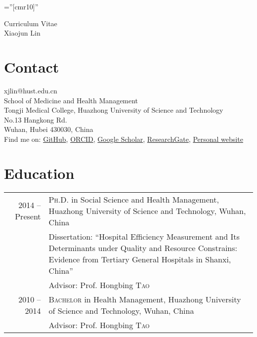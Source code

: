 \documentclass[a4paper,10pt]{article}
\begin{document}
\pagestyle{myheadings}

\font\fb=''[cmr10]'' %

\par{\centering
		{\Huge Curriculum Vitae \\
		\Huge Xiaojun Lin \\
	}\bigskip\par}
	
\thispagestyle{empty} %
 
\section{Contact}
xjlin@hust.edu.cn\\
School of Medicine and Health Management\\
Tongji Medical College, Huazhong University of Science and Technology\\
No.13 Hangkong Rd.\\
Wuhan, Hubei 430030, China\\[.2cm]
Find me on: 
\href{https://github.com/xiaojunlin}{GitHub},
\href{https://orcid.org/0000-0003-4284-2401}{ORCID}, \href{https://scholar.google.com/citations?user=ZBGYTowAAAAJ&hl=zh-CN}{Google Scholar}, \href{https://www.researchgate.net/profile/Xiaojun_Lin2}{ResearchGate}, \href{https://xiaojunlin.github.io}{Personal website}
\section{Education}
\begin{tabular}{r p{11cm}}
 2014 -- Present & \textsc{Ph.D.} in Social Science and Health Management, Huazhong University of Science and Technology, Wuhan, China \\
& \small Dissertation: ``Hospital Efficiency Measurement and Its Determinants under Quality and Resource Constrains: Evidence from Tertiary General Hospitals in Shanxi, China''\\
& \small Advisor: Prof. Hongbing \textsc{Tao}\\
 2010 -- 2014 & \textsc{Bachelor} in Health Management, Huazhong University of Science and Technology, Wuhan, China\\
& \small Advisor: Prof. Hongbing \textsc{Tao}\\
\end{tabular}
\end{document}
